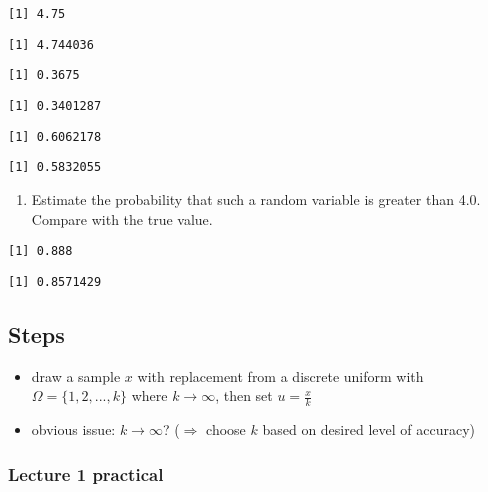 \documentclass[
  letterpaper,
  DIV=11,
  numbers=noendperiod]{scrreprt}
\providecommand{\tightlist}{%
  \setlength{\itemsep}{0pt}\setlength{\parskip}{0pt}}\usepackage{longtable,booktabs,array}
\begin{document}
\begin{verbatim}
[1] 4.75
\end{verbatim}

\begin{verbatim}
[1] 4.744036
\end{verbatim}

\begin{verbatim}
[1] 0.3675
\end{verbatim}

\begin{verbatim}
[1] 0.3401287
\end{verbatim}

\begin{verbatim}
[1] 0.6062178
\end{verbatim}

\begin{verbatim}
[1] 0.5832055
\end{verbatim}

\begin{enumerate}
\def\labelenumi{(\alph{enumi})}
\setcounter{enumi}{1}
\tightlist
\item
  Estimate the probability that such a random variable is greater than
  4.0. Compare with the true value.
\end{enumerate}

\begin{verbatim}
[1] 0.888
\end{verbatim}

\begin{verbatim}
[1] 0.8571429
\end{verbatim}

\subsection{Steps}\label{steps}

\begin{itemize}
\item
  draw a sample \(x\) with replacement from a discrete uniform with
  \(\Omega = \{1, 2, ..., k\}\) where \(k \to \infty\), then set
  \(u = \frac{x}{k}\)
\item
  obvious issue: \(k \to \infty\)? (\(\Rightarrow\) choose \(k\) based
  on desired level of accuracy)
\end{itemize}

\subsubsection{Lecture 1 practical}\label{lecture-1-practical}
\end{document}
